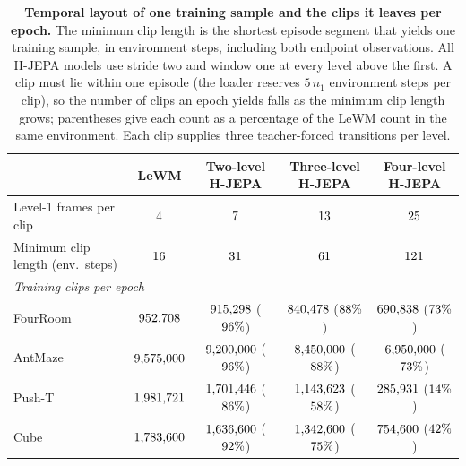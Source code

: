 \begin{table}[ht]
\centering
\small
\caption{\textbf{Temporal layout of one training sample and the clips it leaves per
epoch.} The minimum clip length is the shortest episode segment that yields one
training sample, in environment steps, including both endpoint observations. All H-JEPA
models use stride two and window one at every level above the first. A clip must
lie within one episode (the loader reserves $5\,n_1$ environment steps per clip),
so the number of clips an epoch yields falls as the minimum clip length grows; parentheses give each count as a percentage of the LeWM count in the same
environment. Each clip supplies three teacher-forced transitions per level.}
\label{tab:impl-data}
\setlength{\tabcolsep}{3.0pt}   
\begin{tabular}{lcccc}
\toprule
 & LeWM & Two-level H-JEPA & Three-level H-JEPA & Four-level H-JEPA \\
\midrule
Level-1 frames per clip & $4$ & $7$ & $13$ & $25$ \\
Minimum clip length (env.\ steps) & $16$ & $31$ & $61$ & $121$ \\
\midrule
\multicolumn{5}{l}{\emph{Training clips per epoch}} \\
FourRoom & $952{,}708$ & $915{,}298$ ($96\%$) & $840{,}478$ ($88\%$) & $690{,}838$ ($73\%$) \\
AntMaze & $9{,}575{,}000$ & $9{,}200{,}000$ ($96\%$) & $8{,}450{,}000$ ($88\%$) & $6{,}950{,}000$ ($73\%$) \\
Push-T & $1{,}981{,}721$ & $1{,}701{,}446$ ($86\%$) & $1{,}143{,}623$ ($58\%$) & $285{,}931$ ($14\%$) \\
Cube & $1{,}783{,}600$ & $1{,}636{,}600$ ($92\%$) & $1{,}342{,}600$ ($75\%$) & $754{,}600$ ($42\%$) \\
\bottomrule
\end{tabular}
\end{table}

